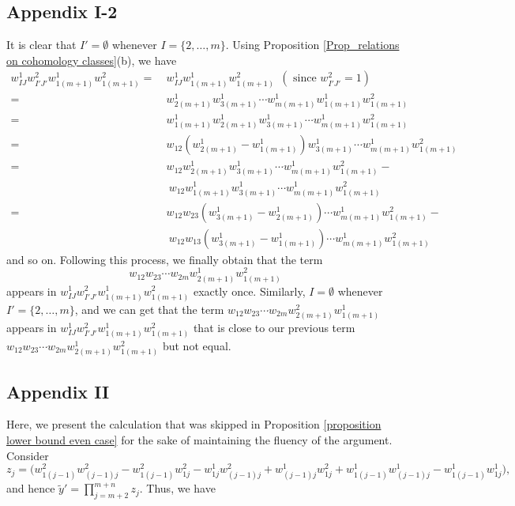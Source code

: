 \documentclass[12pt,oneside,reqno]{amsart}
\theoremstyle{plain}
\theoremstyle{definition}
\theoremstyle{remark}
\begin{document}
\subsection{Appendix I-2}\label{Appendix odd only once}
It is clear that $I'=\emptyset$ whenever $I=\{2,\ldots,m\}$. Using Proposition \ref{Prop_relations on cohomology classes}(b), we have
\begin{align*}
w^1_{IJ}w^2_{I'J'}w^1_{1(m+1)}w^2_{1(m+1)} = & ~w^1_{IJ}w^1_{1(m+1)}w^2_{1(m+1)}~~(\text{ since } w^2_{I'J'}=1)\\
= & ~w^1_{2(m+1)}w^1_{3(m+1)}\cdots w^1_{m(m+1)}w^1_{1(m+1)}w^2_{1(m+1)} \\
= & ~w^1_{1(m+1)}w^1_{2(m+1)}w^1_{3(m+1)}\cdots w^1_{m(m+1)}w^2_{1(m+1)} \\
= & ~w_{12}(w^1_{2(m+1)}-w^1_{1(m+1)})w^1_{3(m+1)}\cdots w^1_{m(m+1)}w^2_{1(m+1)} \\
= & ~w_{12}w^1_{2(m+1)}w^1_{3(m+1)}\cdots w^1_{m(m+1)}w^2_{1(m+1)}-  \\
& ~~ w_{12}w^1_{1(m+1)}w^1_{3(m+1)}\cdots w^1_{m(m+1)}w^2_{1(m+1)} \\
= & ~w_{12}w_{23}(w^1_{3(m+1)} - w^1_{2(m+1)})\cdots w^1_{m(m+1)}w^2_{1(m+1)} - \\
 & ~~ w_{12}w_{13}(w^1_{3(m+1)}-w^1_{1(m+1)})\cdots w^1_{m(m+1)}w^2_{1(m+1)} 
\end{align*}
and so on. Following this process, we finally obtain that the term $$w_{12}w_{23}\cdots w_{2m}w^1_{2(m+1)}w^2_{1(m+1)}$$ appears in $w^1_{IJ}w^2_{I'J'}w^1_{1(m+1)}w^2_{1(m+1)}$ exactly once. 
Similarly, $I=\emptyset$ whenever $I' = \{2,\ldots,m\}$, and we can get that the term $w_{12}w_{23}\cdots w_{2m}w^2_{2(m+1)}w^1_{1(m+1)}$ appears in $w^1_{IJ}w^2_{I'J'}w^1_{1(m+1)}w^2_{1(m+1)}$ that is close to our previous term $w_{12}w_{23}\cdots w_{2m}w^1_{2(m+1)}w^2_{1(m+1)}$ but not equal.

\subsection{Appendix II} \label{app_proposition lower bound even case}
Here, we present the calculation that was skipped in Proposition \ref{proposition lower bound even case} for the sake of maintaining the fluency of the argument. Consider
\begin{equation}\label{Eq_zj}
z_j = \Big(w^2_{1(j-1)} w^2_{(j-1)j} - w^2_{1(j-1)} w^2_{1j} - w^1_{1j} w^2_{(j-1)j} +w^1_{(j-1)j} w^2_{1j} + w^1_{1(j-1)} w^1_{(j-1)j} - w^1_{1(j-1)} w^1_{1j}\Big),
\end{equation}
and hence $\tilde{y}' = \displaystyle\prod^{m+n}_{j=m+2} z_j$. Thus, we have 
\end{document}
